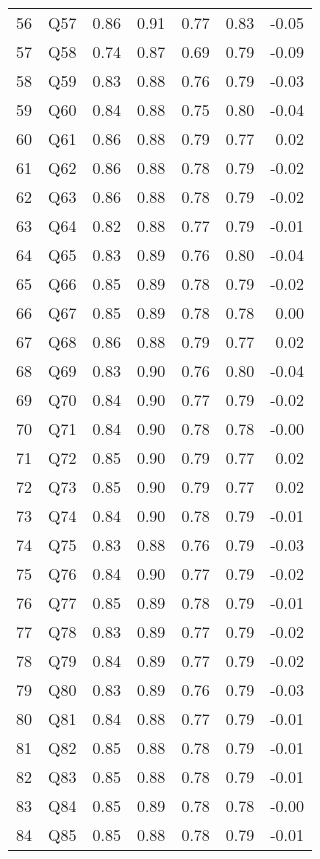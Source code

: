 \documentclass{amsart}
\begin{document}
\begin{table}[ht]
\begin{tabular}{rlrrrrr}
  56 & Q57 & 0.86 & 0.91 & 0.77 & 0.83 & -0.05 \\ 
  57 & Q58 & 0.74 & 0.87 & 0.69 & 0.79 & -0.09 \\ 
  58 & Q59 & 0.83 & 0.88 & 0.76 & 0.79 & -0.03 \\ 
  59 & Q60 & 0.84 & 0.88 & 0.75 & 0.80 & -0.04 \\ 
  60 & Q61 & 0.86 & 0.88 & 0.79 & 0.77 & 0.02 \\ 
  61 & Q62 & 0.86 & 0.88 & 0.78 & 0.79 & -0.02 \\ 
  62 & Q63 & 0.86 & 0.88 & 0.78 & 0.79 & -0.02 \\ 
  63 & Q64 & 0.82 & 0.88 & 0.77 & 0.79 & -0.01 \\ 
  64 & Q65 & 0.83 & 0.89 & 0.76 & 0.80 & -0.04 \\ 
  65 & Q66 & 0.85 & 0.89 & 0.78 & 0.79 & -0.02 \\ 
  66 & Q67 & 0.85 & 0.89 & 0.78 & 0.78 & 0.00 \\ 
  67 & Q68 & 0.86 & 0.88 & 0.79 & 0.77 & 0.02 \\ 
  68 & Q69 & 0.83 & 0.90 & 0.76 & 0.80 & -0.04 \\ 
  69 & Q70 & 0.84 & 0.90 & 0.77 & 0.79 & -0.02 \\ 
  70 & Q71 & 0.84 & 0.90 & 0.78 & 0.78 & -0.00 \\ 
  71 & Q72 & 0.85 & 0.90 & 0.79 & 0.77 & 0.02 \\ 
  72 & Q73 & 0.85 & 0.90 & 0.79 & 0.77 & 0.02 \\ 
  73 & Q74 & 0.84 & 0.90 & 0.78 & 0.79 & -0.01 \\ 
  74 & Q75 & 0.83 & 0.88 & 0.76 & 0.79 & -0.03 \\ 
  75 & Q76 & 0.84 & 0.90 & 0.77 & 0.79 & -0.02 \\ 
  76 & Q77 & 0.85 & 0.89 & 0.78 & 0.79 & -0.01 \\ 
  77 & Q78 & 0.83 & 0.89 & 0.77 & 0.79 & -0.02 \\ 
  78 & Q79 & 0.84 & 0.89 & 0.77 & 0.79 & -0.02 \\ 
  79 & Q80 & 0.83 & 0.89 & 0.76 & 0.79 & -0.03 \\ 
  80 & Q81 & 0.84 & 0.88 & 0.77 & 0.79 & -0.01 \\ 
  81 & Q82 & 0.85 & 0.88 & 0.78 & 0.79 & -0.01 \\ 
  82 & Q83 & 0.85 & 0.88 & 0.78 & 0.79 & -0.01 \\ 
  83 & Q84 & 0.85 & 0.89 & 0.78 & 0.78 & -0.00 \\ 
  84 & Q85 & 0.85 & 0.88 & 0.78 & 0.79 & -0.01 \\ 

\end{tabular}
\end{table}
\end{document}
